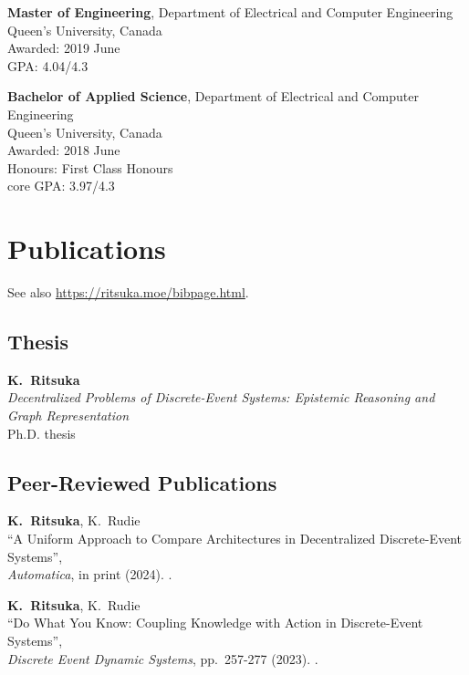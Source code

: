 \documentclass[margin]{res}
\begin{document}
\begin{resume}

\textbf{Master of Engineering},
Department of Electrical and Computer Engineering \\
Queen's University, Canada\\
\null\qquad Awarded: 2019 June\\
\null\qquad GPA: 4.04/4.3

\textbf{Bachelor of Applied Science},
Department of Electrical and Computer Engineering\\
Queen's University, Canada\\
\null\qquad Awarded: 2018 June\\
\null\qquad Honours: First Class Honours\\
\null\qquad core GPA: 3.97/4.3


\section{Publications}

See also \url{https://ritsuka.moe/bibpage.html}.

\subsection{Thesis}

{\bf K.~Ritsuka}\\
\textit{Decentralized Problems of Discrete-Event Systems:
Epistemic Reasoning and Graph Representation}\\
Ph.D. thesis

\subsection{Peer-Reviewed Publications}

{\bf K.~Ritsuka}, K.~Rudie\\
``A Uniform Approach to Compare Architectures in Decentralized Discrete-Event Systems'',\\
\emph{Automatica}, in print (2024).
.

{\bf K.~Ritsuka}, K.~Rudie\\
``Do What You Know: Coupling Knowledge with Action in Discrete-Event Systems'',\\
\emph{Discrete Event Dynamic Systems}, pp.~257-277 (2023).
.


\end{resume}
\end{document}

